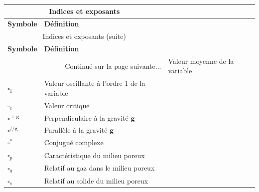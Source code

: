 \begin{center}
\bigskip

    \begin{longtable}{p{} @{} p{}}
        \multicolumn{2}{c}{Indices et exposants}  \\\hline
        \textbf{Symbole} & \textbf{Définition} \\\hline\hline \endfirsthead
        \multicolumn{2}{c}{Indices et exposants (suite)}  \\\hline
        \textbf{Symbole} & \textbf{Définition} \\\hline\hline \endhead
		
		\hline
		\multicolumn{2}{r}{Continué sur la page suivante...} \endfoot
        \hline \endlastfoot
        $\square_0$	& Valeur moyenne de la variable \\
        $\square_1$ & Valeur oscillante à l'ordre 1 de la variable \\
		$\square_c$ & Valeur critique \\
		$\square^{\perp \mathbf g}$ & Perpendiculaire à la gravité $\mathbf g$ \\
		$\square^{//\mathbf g}$ & Parallèle à la gravité $\mathbf g$ \\
		$\square^*$ & Conjugué complexe\\
		$\square_p$ & Caractéristique du milieu poreux \\		
		$\square_g$ & Relatif au gaz dans le milieu poreux \\
		$\square_s$ & Relatif au solide du milieu poreux \\
		\hline
	\end{longtable}
\end{center}